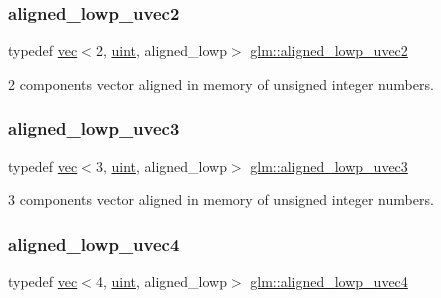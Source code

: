 \subsubsection{\texorpdfstring{aligned\+\_\+lowp\+\_\+uvec2}{aligned\_lowp\_uvec2}}
{\footnotesize\ttfamily typedef \hyperlink{structglm_1_1vec}{vec}$<$2, \hyperlink{group__core__precision_ga4fd29415871152bfb5abd588334147c8}{uint}, aligned\+\_\+lowp$>$ \hyperlink{group__gtc__type__aligned_gabd374d47967c0eefc8b98a405d064cc6}{glm\+::aligned\+\_\+lowp\+\_\+uvec2}}



2 components vector aligned in memory of unsigned integer numbers. 

\mbox{\label{group__gtc__type__aligned_gadaa291d4c8716193c6294d6e711eb071}} 
\subsubsection{\texorpdfstring{aligned\+\_\+lowp\+\_\+uvec3}{aligned\_lowp\_uvec3}}
{\footnotesize\ttfamily typedef \hyperlink{structglm_1_1vec}{vec}$<$3, \hyperlink{group__core__precision_ga4fd29415871152bfb5abd588334147c8}{uint}, aligned\+\_\+lowp$>$ \hyperlink{group__gtc__type__aligned_gadaa291d4c8716193c6294d6e711eb071}{glm\+::aligned\+\_\+lowp\+\_\+uvec3}}



3 components vector aligned in memory of unsigned integer numbers. 

\mbox{\label{group__gtc__type__aligned_ga4d1ee133cfc4f795052958ffab70d746}} 
\subsubsection{\texorpdfstring{aligned\+\_\+lowp\+\_\+uvec4}{aligned\_lowp\_uvec4}}
{\footnotesize\ttfamily typedef \hyperlink{structglm_1_1vec}{vec}$<$4, \hyperlink{group__core__precision_ga4fd29415871152bfb5abd588334147c8}{uint}, aligned\+\_\+lowp$>$ \hyperlink{group__gtc__type__aligned_ga4d1ee133cfc4f795052958ffab70d746}{glm\+::aligned\+\_\+lowp\+\_\+uvec4}}



